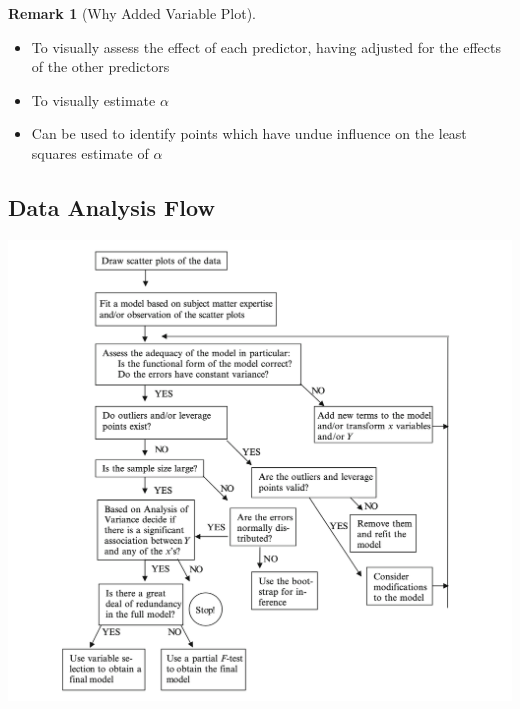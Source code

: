 \documentclass[11pt]{article}
\theoremstyle{definition}
\newtheorem{remark}{Remark}[section]
\numberwithin{equation}{section}
\begin{document}
\begin{remark}[Why Added Variable Plot]
 \begin{itemize}
 \item To visually assess the effect of each predictor, having adjusted for the effects of the other predictors
 \item To visually estimate $\alpha$
 \item Can be used to identify points which have undue influence on the least squares estimate of $\alpha$
 \end{itemize} 
\end{remark}

\subsection{Data Analysis Flow}

  \includegraphics[width=\textwidth]{./images/data-analysis-flow}
\end{document}
